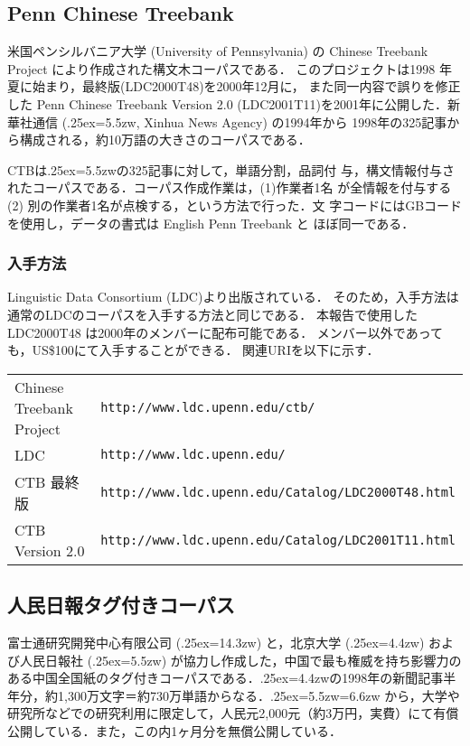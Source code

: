 \subsection{Penn Chinese Treebank}
\label{CTB_CORPUS}
米国ペンシルバニア大学 (University of Pennsylvania) の Chinese Treebank
Project により作成された構文木コーパスである．
このプロジェクトは1998 年夏に始まり，最終版(LDC2000T48)を2000年12月に，
また同一内容で誤りを修正した Penn Chinese Treebank Version 2.0
(LDC2001T11)を2001年に公開した．新華社通信 
(\lower.25ex\hbox{\epsfxsize=5.5zw}, Xinhua News Agency) の1994年から
1998年の325記事から構成される，約10万語の大きさのコーパスである．


CTBは\lower.25ex\hbox{\epsfxsize=5.5zw}の325記事に対して，単語分割，品詞付
与，構文情報付与されたコーパスである．コーパス作成作業は，(1)作業者1名
が全情報を付与する (2) 別の作業者1名が点検する，という方法で行った．文
字コードにはGBコードを使用し，データの書式は English Penn Treebank と
ほぼ同一である．

\subsubsection*{入手方法}
Linguistic Data Consortium (LDC)より出版されている．
そのため，入手方法は通常のLDCのコーパスを入手する方法と同じである．
本報告で使用した LDC2000T48 は2000年のメンバーに配布可能である．
メンバー以外であっても，US\$100にて入手することができる．
関連URIを以下に示す．

\begin{tabular}{ll}
{Chinese Treebank Project}&{\tt\small http://www.ldc.upenn.edu/ctb/}\\
LDC &{\tt\small http://www.ldc.upenn.edu/}\\
CTB 最終版 &{\tt\small http://www.ldc.upenn.edu/Catalog/LDC2000T48.html}\\
CTB Version 2.0 & {\tt\small http://www.ldc.upenn.edu/Catalog/LDC2001T11.html}\\
\end{tabular}
\subsection{人民日報タグ付きコーパス}
\label{PKU_CORPUS}
富士通研究開発中心有限公司 (\lower.25ex\hbox{\epsfxsize=14.3zw}) と，北京大学 (\lower.25ex\hbox{\epsfxsize=4.4zw}) および人民日報社 (\lower.25ex\hbox{\epsfxsize=5.5zw}) が協力し作成した，中国で最も権威を持ち影響力のある中国全国紙のタグ付きコーパスである．\lower.25ex\hbox{\epsfxsize=4.4zw}の1998年の新聞記事半年分，約1,300万文字＝約730万単語からなる．\lower.25ex\hbox{\epsfxsize=5.5zw\epsfxsize=6.6zw}
から，大学や研究所などでの研究利用に限定して，人民元2,000元（約3万円，実費）にて有償公開している．また，この内1ヶ月分を無償公開している．

